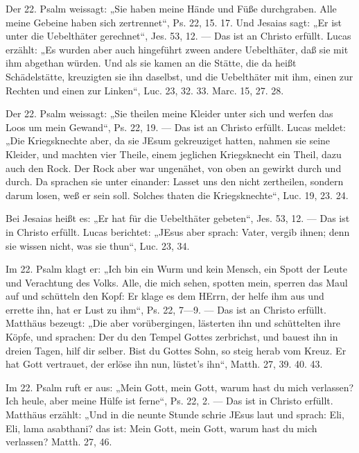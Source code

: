 Der 22. Psalm weissagt: „Sie haben meine Hände und Füße durchgraben. Alle meine Gebeine haben sich zertrennet“, Ps. 22, 15. 17. Und Jesaias sagt: „Er ist unter die Uebelthäter gerechnet“, Jes. 53, 12. — Das ist an Christo erfüllt. Lucas erzählt: „Es wurden aber auch hingeführt zween andere Uebelthäter, daß sie mit ihm abgethan würden. Und als sie kamen an die Stätte, die da heißt Schädelstätte, kreuzigten sie ihn daselbst, und die Uebelthäter mit ihm, einen zur Rechten und einen zur Linken“, Luc. 23, 32. 33. Marc. 15, 27. 28.

 Der 22. Psalm weissagt: „Sie theilen meine Kleider unter sich und werfen das Loos um mein Gewand“, Ps. 22, 19. — Das ist an Christo erfüllt. Lucas meldet: „Die Kriegsknechte aber, da sie JEsum gekreuziget hatten, nahmen sie seine Kleider, und machten vier Theile, einem jeglichen Kriegsknecht ein Theil, dazu auch den Rock. Der Rock aber war ungenähet, von oben an gewirkt durch und durch. Da sprachen sie unter einander: Lasset uns den nicht zertheilen, sondern darum losen, weß er sein soll. Solches thaten die Kriegsknechte“, Luc. 19, 23. 24.

 Bei Jesaias heißt es: „Er hat für die Uebelthäter gebeten“, Jes. 53, 12. — Das ist in Christo erfüllt. Lucas berichtet: „JEsus aber sprach: Vater, vergib ihnen; denn sie wissen nicht, was sie thun“, Luc. 23, 34.

 Im 22. Psalm klagt er: „Ich bin ein Wurm und kein Mensch, ein Spott der Leute und Verachtung des Volks. Alle, die mich sehen, spotten mein, sperren das Maul auf und schütteln den Kopf: Er klage es dem HErrn, der helfe ihm aus und errette ihn, hat er Lust zu ihm“, Ps. 22, 7—9. — Das ist an Christo erfüllt. Matthäus bezeugt: „Die aber vorübergingen, lästerten ihn und schüttelten ihre Köpfe, und sprachen: Der du den Tempel Gottes zerbrichst, und bauest ihn in dreien Tagen, hilf dir selber. Bist du Gottes Sohn, so steig herab vom Kreuz. Er hat Gott vertrauet, der erlöse ihn nun, lüstet’s ihn“, Matth. 27, 39. 40. 43.

 Im 22. Psalm ruft er aus: „Mein Gott, mein Gott, warum hast du mich verlassen? Ich heule, aber meine Hülfe ist ferne“, Ps. 22, 2. — Das ist in Christo erfüllt. Matthäus erzählt: „Und
in die neunte Stunde schrie JEsus laut und sprach: Eli, Eli, lama asabthani? das ist: Mein Gott, mein Gott, warum hast du mich verlassen? Matth. 27, 46.

